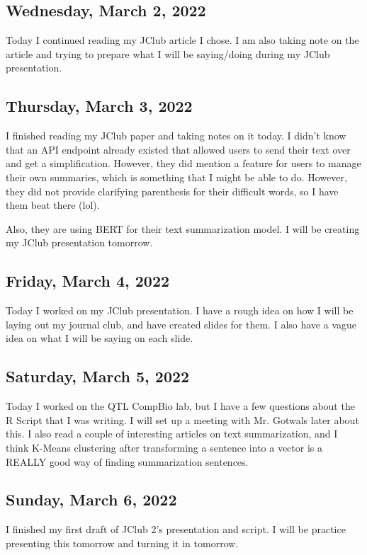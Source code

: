 \documentclass[11pt,letterpaper]{article}
\begin{document}
\subsection{Wednesday, March 2, 2022}
Today I continued reading my JClub article I chose. I am also taking note on the article and trying to prepare what I will be saying/doing during my JClub presentation.

\subsection{Thursday, March 3, 2022}
I finished reading my JClub paper and taking notes on it today. I didn't know that an API endpoint already existed that allowed users to send their text over and get a simplification. However, they did mention a feature for users to manage their own summaries, which is something that I might be able to do. However, they did not provide clarifying parenthesis for their difficult words, so I have them beat there (lol).

Also, they are using BERT for their text summarization model. I will be creating my JClub presentation tomorrow.

\subsection{Friday, March 4, 2022}
Today I worked on my JClub presentation. I have a rough idea on how I will be laying out my journal club, and have created slides for them. I also have a vague idea on what I will be saying on each slide.

\subsection{Saturday, March 5, 2022}
Today I worked on the QTL CompBio lab, but I have a few questions about the R Script that I was writing. I will set up a meeting with Mr. Gotwals later about this. I also read a couple of interesting articles on text summarization, and I think K-Means clustering after transforming a sentence into a vector is a REALLY good way of finding summarization sentences.

\subsection{Sunday, March 6, 2022}
I finished my first draft of JClub 2's presentation and script. I will be practice presenting this tomorrow and turning it in tomorrow.
\end{document}
